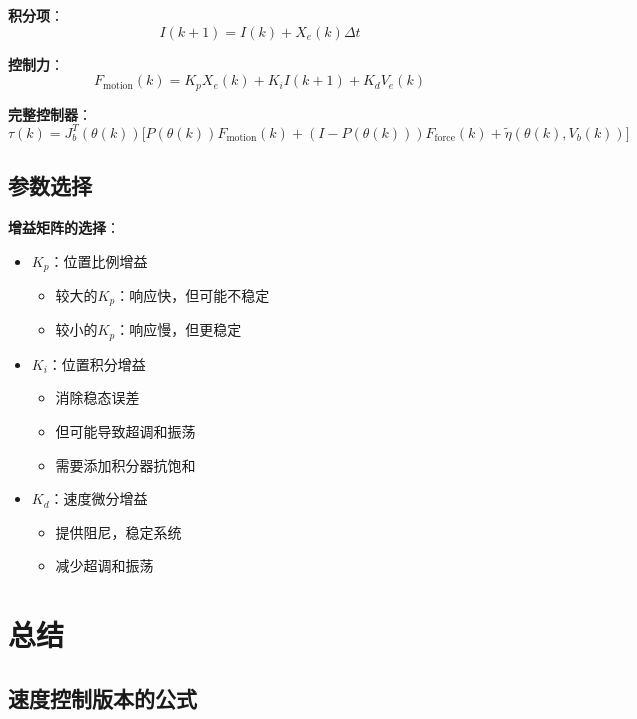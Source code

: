 \documentclass[12pt,a4paper]{article}
\begin{document}
\textbf{积分项}：
\begin{equation}
I(k+1) = I(k) + X_e(k)\Delta t
\end{equation}

\textbf{控制力}：
\begin{equation}
F_{\text{motion}}(k) = K_p X_e(k) + K_i I(k+1) + K_d V_e(k)
\end{equation}

\textbf{完整控制器}：
\begin{equation}
\tau(k) = J_b^T(\theta(k))\Bigg[P(\theta(k))F_{\text{motion}}(k) + (I - P(\theta(k)))F_{\text{force}}(k) + \tilde{\eta}(\theta(k), V_b(k))\Bigg]
\end{equation}

\subsection{参数选择}

\textbf{增益矩阵的选择}：

\begin{itemize}
\item \textbf{$K_p$}：位置比例增益
\begin{itemize}
\item 较大的$K_p$：响应快，但可能不稳定
\item 较小的$K_p$：响应慢，但更稳定
\end{itemize}

\item \textbf{$K_i$}：位置积分增益
\begin{itemize}
\item 消除稳态误差
\item 但可能导致超调和振荡
\item 需要添加积分器抗饱和
\end{itemize}

\item \textbf{$K_d$}：速度微分增益
\begin{itemize}
\item 提供阻尼，稳定系统
\item 减少超调和振荡
\end{itemize}
\end{itemize}

\section{总结}

\subsection{速度控制版本的公式}
\end{document}
